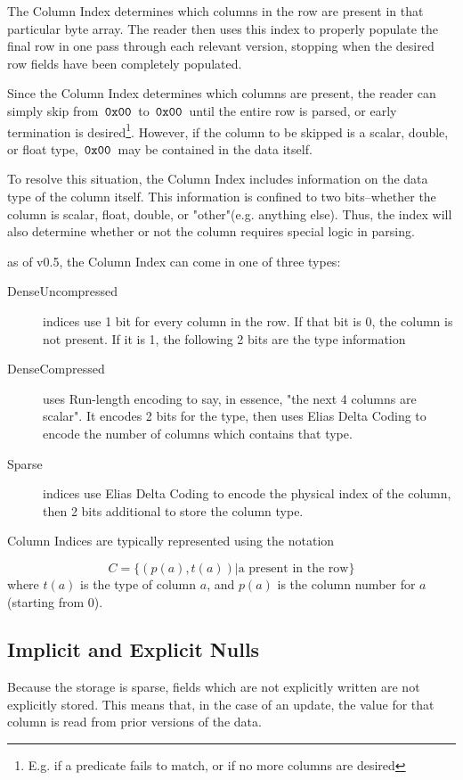 The Column Index determines which columns in the row are present in that particular byte array. The reader then uses this index to properly populate the final row in one pass through each relevant version, stopping when the desired row fields have been completely populated.

Since the Column Index determines which columns are present, the reader can simply skip from $\,\texttt{0x00}\,$ to $\,\texttt{0x00}\,$ until the entire row is parsed, or early termination is desired\footnote{E.g. if a predicate fails to match, or if no more columns are desired}. However, if the column to be skipped is a scalar, double, or float type, $\,\texttt{0x00}\,$ may be contained in the data itself.

To resolve this situation, the Column Index includes information on the data type of the column itself. This information is confined to two bits--whether the column is scalar, float, double, or "other"(e.g. anything else). Thus, the index will also determine whether or not the column requires special logic in parsing.

as of v0.5, the Column Index can come in one of three types: 

\begin{description}
				\item[DenseUncompressed] indices use 1 bit for every column in the row. If that bit is 0, the column is not present. If it is 1, the following 2 bits are the type information
				\item[DenseCompressed] uses Run-length encoding to say, in essence, "the next 4 columns are scalar". It encodes 2 bits for the type, then uses Elias Delta Coding to encode the number of columns which contains that type.
				\item[Sparse] indices use Elias Delta Coding to encode the physical index of the column, then 2 bits additional to store the column type.
\end{description}

Column Indices are typically represented using the notation 

\begin{displaymath}
				C = \{(p(a),t(a)) | \text{a present in the row}\}
\end{displaymath}
where $t(a)$ is the type of column $a$, and $p(a)$ is the column number for $a$(starting from 0).

\subsection{Implicit and Explicit Nulls}
Because the storage is sparse, fields which are not explicitly written are not explicitly stored. This means that, in the case of an update, the value for that column is read from prior versions of the data. 

